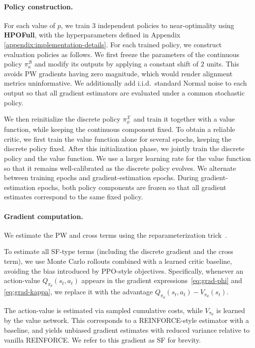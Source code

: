\documentclass{article}
\theoremstyle{definition}
\theoremstyle{remark}
\begin{document}
\paragraph{Policy construction.}
For each value of $p$, we train $3$ independent policies to near-optimality using \textbf{HPOFull}, with the hyperparameters defined in Appendix \ref{appendix:implementation-details}.
For each trained policy, we construct evaluation policies as follows. We first freeze the parameters of the continuous policy $\pi^{\mathcal{B}}_{\kappa}$ and modify its outputs by applying a constant shift of $2$ units. This avoids PW gradients having zero magnitude, which would render alignment metrics uninformative. We additionally add i.i.d.\ standard Normal noise to each output so that all gradient estimators are evaluated under a common stochastic policy.

We then reinitialize the discrete policy $\pi^{\mathcal{X}}_{\phi}$ and train it together with a value function, while keeping the continuous component fixed. To obtain a reliable critic, we first train the value function alone for several epochs, keeping the discrete policy fixed.
After this initialization phase, we jointly train the discrete policy and the value function. We use a larger learning rate for the value function so that it remains well-calibrated as the discrete policy evolves. We alternate between training epochs and gradient-estimation epochs. During gradient-estimation epochs, both policy components are frozen so that all gradient estimates correspond to the same fixed policy.

\paragraph{Gradient computation.}
We estimate the PW and cross terms using the reparameterization trick~\citep{kingma2013auto,rezende2014stochastic}.

To estimate all SF-type terms (including the discrete gradient and the cross term), we use Monte Carlo rollouts combined with a learned critic baseline, avoiding the bias introduced by PPO-style objectives. Specifically, whenever an action-value $Q_{\pi_{\theta}}(s_t,a_t)$ appears in the gradient expressions~\eqref{eq:grad-phi} and \eqref{eq:grad-kappa}, we replace it with the advantage $Q_{\pi_{\theta}}(s_t,a_t) - V_{\pi_{\theta}}(s_t)$.

The action-value is estimated via sampled cumulative costs, while $V_{\pi_{\theta}}$ is learned by the value network. This corresponds to a REINFORCE-style estimator with a baseline, and yields unbiased gradient estimates with reduced variance relative to vanilla REINFORCE. We refer to this gradient as SF for brevity.
\end{document}
